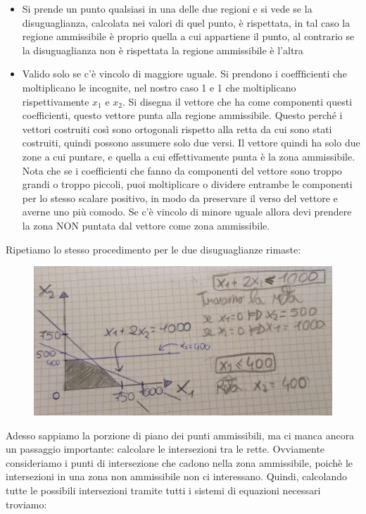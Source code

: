 \documentclass{article}
\begin{document}
\begin{itemize}
    \item Si prende un punto qualsiasi in una delle due regioni e si vede se la disuguaglianza, calcolata nei valori di quel punto, è rispettata, in tal caso la regione ammissibile è proprio quella a cui appartiene il punto, al contrario se la disuguaglianza non è rispettata la regione ammissibile è l'altra
    \item Valido solo se c'è vincolo di maggiore uguale. Si prendono i coeffficienti che moltiplicano le incognite, nel nostro caso 1 e 1 che moltiplicano rispettivamente $x_1$ e $x_2$. Si disegna il vettore che ha come componenti questi coefficienti, questo vettore punta alla regione ammissibile. Questo perché i vettori costruiti così sono ortogonali rispetto alla retta da cui sono stati costruiti, quindi possono assumere solo due versi. Il vettore quindi ha solo due zone a cui puntare, e quella a cui effettivamente punta è la zona ammissibile. Nota che se i coefficienti che fanno da componenti del vettore sono troppo grandi o troppo piccoli, puoi moltiplicare o dividere entrambe le componenti per lo stesso scalare positivo, in modo da preservare il verso del vettore e averne uno più comodo. Se c'è vincolo di minore uguale allora devi prendere la zona NON puntata dal vettore come zona ammissibile.
\end{itemize}
Ripetiamo lo stesso procedimento per le due disuguaglianze rimaste:
\begin{figure}[h!]
    \centering
    \includegraphics[scale=0.3]{retta2}
\end{figure}
Adesso sappiamo la porzione di piano dei punti ammissibili, ma ci manca ancora un passaggio importante: calcolare le intersezioni tra le rette. Ovviamente consideriamo i punti di intersezione che cadono nella zona ammissibile, poichè le intersezioni in una zona non ammissibile non ci interessano. Quindi, calcolando tutte le possibili intersezioni tramite tutti i sistemi di equazioni necessari troviamo:
\end{document}
